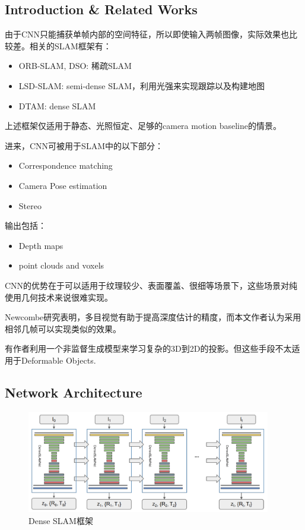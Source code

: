 \subsection{Introduction \& Related Works}

由于CNN只能捕获单帧内部的空间特征，所以即使输入两帧图像，实际效果也比较差。相关的SLAM框架有：

\begin{itemize}
\item ORB-SLAM, DSO: 稀疏SLAM
\item LSD-SLAM: semi-dense SLAM，利用光强来实现跟踪以及构建地图
\item DTAM: dense SLAM
\end{itemize}

上述框架仅适用于静态、光照恒定、足够的camera motion baseline的情景。

进来，CNN可被用于SLAM中的以下部分：
\begin{itemize}
\item Correspondence matching
\item Camera Pose estimation
\item Stereo
\end{itemize}
输出包括：
\begin{itemize}
\item Depth maps
\item point clouds and voxels
\end{itemize}
CNN的优势在于可以适用于纹理较少、表面覆盖、很细等场景下，这些场景对纯使用几何技术来说很难实现。

Newcombe研究表明，多目视觉有助于提高深度估计的精度，而本文作者认为采用相邻几帧可以实现类似的效果。

有作者利用一个非监督生成模型来学习复杂的3D到2D的投影。但这些手段不太适用于Deformable Objects.

\subsection{Network Architecture}

\begin{figure}[!htbp]
\centering
\includegraphics[width=0.95\textwidth]{SemanticSLAM/DenseSLAMNet1.png}
\caption{Dense SLAM框架}
\label{DenseSLAMNet1}
\end{figure}

